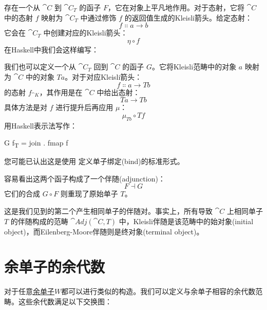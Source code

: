 
存在一个从 $\cat{C}$ 到 $\cat{C}_T$ 的函子 $F$，它在对象上平凡地作用。对于态射，它将 $\cat{C}$ 中的态射 $f$ 映射为 $\cat{C}_T$ 中通过修饰 $f$ 的返回值生成的Kleisli箭头。给定态射：
$$f \Colon a \to b$$
它会在 $\cat{C}_T$ 中创建对应的Kleisli箭头：
$$\eta \circ f$$
在Haskell中我们会这样编写：


我们也可以定义一个从 $\cat{C}_T$ 回到 $\cat{C}$ 的函子 $G$。它将Kleisli范畴中的对象 $a$ 映射为 $\cat{C}$ 中的对象 $T a$。对于对应Kleisli箭头：
$$f \Colon a \to T b$$
的态射 $f_{\cat{K}}$，其作用是在 $\cat{C}$ 中给出态射：
$$T a \to T b$$
具体方法是对 $f$ 进行提升后再应用 $\mu$：
$$\mu_{T b} \circ T f$$
用Haskell表示法写作：

\begin{snipv}
G f\textsubscript{T} = join . fmap f
\end{snipv}
您可能已认出这是使用  定义单子绑定(bind)的标准形式。

容易看出这两个函子构成了一个伴随(adjunction)：
$$F \dashv G$$
它们的合成 $G \circ F$ 则重现了原始单子 $T$。

这是我们见到的第二个产生相同单子的伴随对。事实上，所有导致 $\cat{C}$ 上相同单子 $T$ 的伴随构成的范畴 $\cat{Adj}(\cat{C}, T)$ 中，Kleisli伴随是该范畴中的始对象(initial object)，而Eilenberg-Moore伴随则是终对象(terminal object)。

\section{余单子的余代数}

对于任意\hyperref[comonads]{余单子}$W$都可以进行类似的构造。我们可以定义与余单子相容的余代数范畴。这些余代数满足以下交换图：

\begin{figure}[H]
  \centering
  \begin{subfigure}
    \centering
  \end{subfigure}%
  \hspace{1cm}
  \begin{subfigure}
    \centering
  \end{subfigure}
\end{figure}


